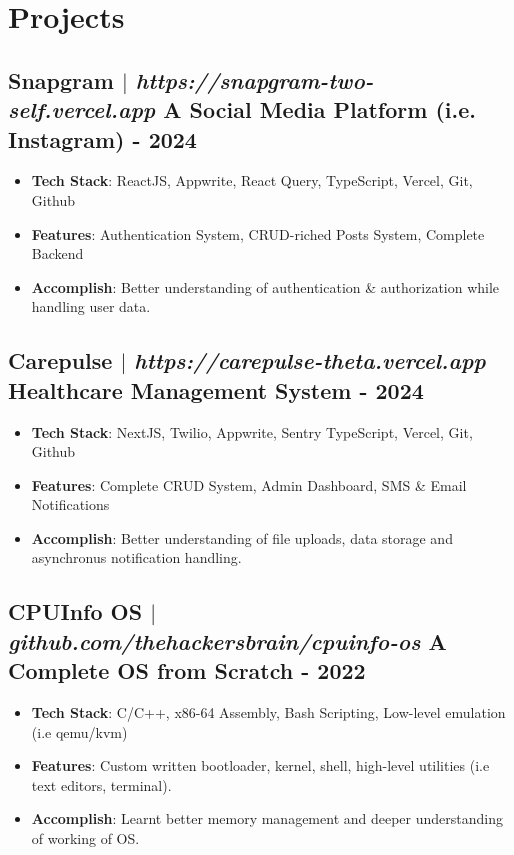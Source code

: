 \documentclass[11pt]{article} %
\begin{document}
\section{Projects}
\subsection{Snapgram $|$ \normalfont\textit{https://snapgram-two-self.vercel.app} \hfill A Social Media Platform (i.e. Instagram) - \textbf{2024}}
\vspace{3pt}
\begin{itemize}
  \item \textbf{Tech Stack}: ReactJS, Appwrite, React Query, TypeScript, Vercel, Git, Github
  \item \textbf{Features}: Authentication System, CRUD-riched Posts System, Complete Backend
  \item \textbf{Accomplish}: Better understanding of authentication \& authorization while handling user data.
\end{itemize}

\subsection{Carepulse $|$ \normalfont\textit{https://carepulse-theta.vercel.app} \hfill Healthcare Management System - \textbf{2024}}
\vspace{3pt}
\begin{itemize}
  \item \textbf{Tech Stack}: NextJS, Twilio, Appwrite, Sentry TypeScript, Vercel, Git, Github
  \item \textbf{Features}: Complete CRUD System, Admin Dashboard, SMS \& Email Notifications
  \item \textbf{Accomplish}: Better understanding of file uploads, data storage and asynchronus notification handling.
\end{itemize}

\subsection{CPUInfo OS $|$ \normalfont\textit{github.com/thehackersbrain/cpuinfo-os} \hfill A Complete OS from Scratch - \textbf{2022}}
\vspace{3pt}
\begin{itemize}
  \item \textbf{Tech Stack}: C/C++, x86-64 Assembly, Bash Scripting, Low-level emulation (i.e qemu/kvm)
  \item \textbf{Features}: Custom written bootloader, kernel, shell, high-level utilities (i.e text editors, terminal).
  \item \textbf{Accomplish}: Learnt better memory management and deeper understanding of working of OS.
\end{itemize}
\end{document}
